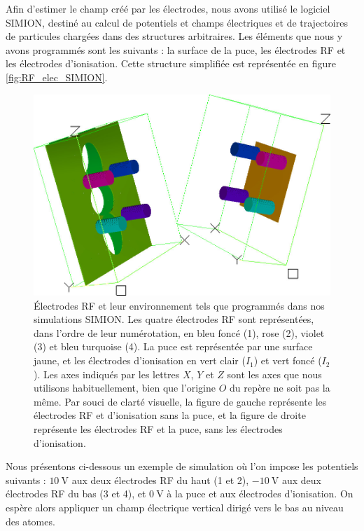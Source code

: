Afin d'estimer le champ créé par les électrodes, nous avons utilisé le logiciel SIMION, destiné au calcul de potentiels et champs électriques et de trajectoires de particules chargées dans des structures arbitraires.
Les éléments que nous y avons programmés sont les suivants : la surface de la puce, les électrodes RF et les électrodes d'ionisation.
Cette structure simplifiée est représentée en figure \eqref{fig:RF_elec_SIMION}.
%
\begin{figure}[!h]
\centering
\includegraphics[width=\linewidth]{figures/setup/rydberg/RF_electrodes_Simion}
\caption[Électrodes de circularisation et de contrôle du champ parallèle]{
Électrodes \og RF \fg{} et leur environnement tels que programmés dans nos simulations SIMION.
Les quatre électrodes RF sont représentées, dans l'ordre de leur numérotation, en bleu foncé (1), rose (2), violet (3) et bleu turquoise (4).
La puce est représentée par une surface jaune, et les électrodes d'ionisation en vert clair ($I_1$) et vert foncé ($I_2$).
Les axes indiqués par les lettres $X$, $Y$ et $Z$ sont les axes que nous utilisons habituellement, bien que l'origine $O$ du repère ne soit pas la même.
Par souci de clarté visuelle, la figure de gauche représente les électrodes RF et d'ionisation sans la puce, et la figure de droite représente les électrodes RF et la puce, sans les électrodes d'ionisation.
}
\label{fig:RF_elec_SIMION}
\end{figure}
%

Nous présentons ci-dessous un exemple de simulation où l'on impose les potentiels suivants :
$\SI{+10}{\V}$ aux deux électrodes RF du haut (1 et 2), $\SI{-10}{\V}$ aux deux électrodes RF du bas (3 et 4), et $\SI{0}{\V}$ à la puce et aux électrodes d'ionisation.
On espère alors appliquer un champ électrique vertical dirigé vers le bas au niveau des atomes.

